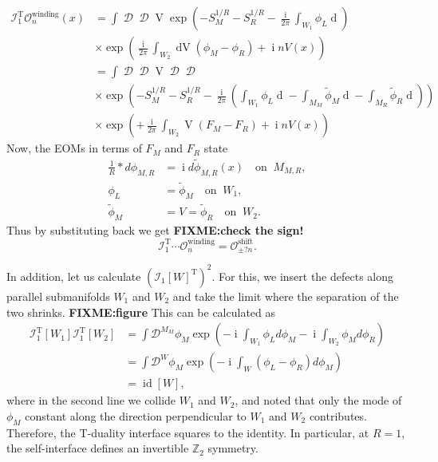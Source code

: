 \documentclass[
  letterpaper,
  DIV=11,
  numbers=noendperiod]{scrreport}
\DeclareMathOperator{\imunit}{i}
\DeclareMathOperator{\id}{id}
\begin{document}
\[
\begin{aligned}
\mathcal{I}_1^\text{T} \mathcal{O}^\text{winding}_n(x)
&= \int \mathop{\mathcal{D}\phi_M}\mathop{\mathcal{D}\phi_R}\mathop{\mathcal{D}^{W_2}V}
\exp\left(-S_M^{1/R}-S_R^{1/R}-\frac{\imunit}{2\pi}\int_{W_1}\phi_L \mathop{d\phi_M}\right)\\
 &\times\exp\left(\frac{\imunit}{2\pi}\int_{W_2}\mathop{dV}(\phi_M-\phi_R) + \imunit n V(x) \right)\\
&= \int \mathop{\mathcal{D}F_M}\mathop{\mathcal{D}F_R}\mathop{\mathcal{D}^{W_2}V}\mathop{\mathcal{D}\widetilde\phi_M}\mathop{\mathcal{D}\widetilde\phi_R}\\
&\times\exp\left(-S_M^{1/R}-S_R^{1/R}-\frac{\imunit}{2\pi}(\int_{W_1}\phi_L \mathop{d\phi_M}-\int_{M_M}\tilde{\phi}_M\mathop{dF_M} - \int_{M_R}\tilde{\phi}_R\mathop{dF_R})\right)\\
 &\times\exp\left(+\frac{\imunit}{2\pi}\int_{W_2}\mathop{V}(F_M-F_R) + \imunit n V(x) \right)
\end{aligned}
\] Now, the EOMs in terms of \(F_M\) and \(F_R\) state \[
\begin{aligned}
    \frac{1}{R} *d\phi_{M,R} &= \imunit d\widetilde\phi_{M,R}(x) \quad \text{on} \;\; M_{M,R}, \\
    \phi_L &= \widetilde{\phi}_M \quad \text{on} \;\; W_1,\\
\tilde{\phi}_M &= V = \tilde{\phi}_R \quad \text{on} \;\; W_2.
\end{aligned}
\] Thus by substituting back we get \textbf{FIXME:check the sign!} \[
\mathcal{I}_1^\text{T}\cdots\mathcal{O}_n^\text{winding} = \mathcal{O}_{\pm? n}^\text{shift}.
\]

In addition, let us calculate \((\mathcal{I}_1[W]^\text{T})^2\). For
this, we insert the defects along parallel submanifolds \(W_1\) and
\(W_2\) and take the limit where the separation of the two shrinks.
\textbf{FIXME:figure} This can be calculated as \[
\begin{aligned}
\mathcal{I}_1^\text{T}[W_1]\mathcal{I}_1^\text{T}[W_2]
&= \int \mathcal{D}^{M_M}\phi_M \exp(-\imunit \int_{W_1} \phi_L d\phi_M - \imunit\int_{W_2} \phi_M d\phi_R)\\
&= \int \mathcal{D}^{W}\phi_M \exp(-\imunit \int_{W} (\phi_L - \phi_R) d\phi_M)\\
&= \id[W],
\end{aligned}
\] where in the second line we collide \(W_1\) and \(W_2\), and noted
that only the mode of \(\phi_M\) constant along the direction
perpendicular to \(W_1\) and \(W_2\) contributes. Therefore, the
T-duality interface squares to the identity. In particular, at \(R=1\),
the self-interface defines an invertible \(\mathbb{Z}_2\) symmetry.
\end{document}
